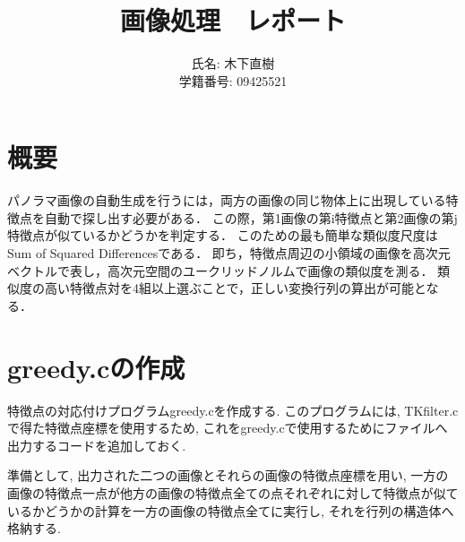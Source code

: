 \documentclass[a4j]{jarticle}
\title{画像処理　レポート}
\author{氏名: 木下直樹\\学籍番号: 09425521}
\begin{document}
\maketitle

\section{概要}
パノラマ画像の自動生成を行うには，両方の画像の同じ物体上に出現している特徴点を自動で探し出す必要がある．
この際，第1画像の第i特徴点と第2画像の第j特徴点が似ているかどうかを判定する．
このための最も簡単な類似度尺度はSum of Squared Differencesである．
即ち，特徴点周辺の小領域の画像を高次元ベクトルで表し，高次元空間のユークリッドノルムで画像の類似度を測る．
類似度の高い特徴点対を4組以上選ぶことで，正しい変換行列の算出が可能となる．

\section{greedy.cの作成}
特徴点の対応付けプログラムgreedy.cを作成する.
このプログラムには, TKfilter.cで得た特徴点座標を使用するため, 
これをgreedy.cで使用するためにファイルへ出力するコードを追加しておく.

準備として, 出力された二つの画像とそれらの画像の特徴点座標を用い, 一方の画像の特徴点一点が他方の画像の特徴点全ての点それぞれに対して特徴点が似ているかどうかの計算を一方の画像の特徴点全てに実行し, それを行列の構造体へ格納する.
\end{document}
